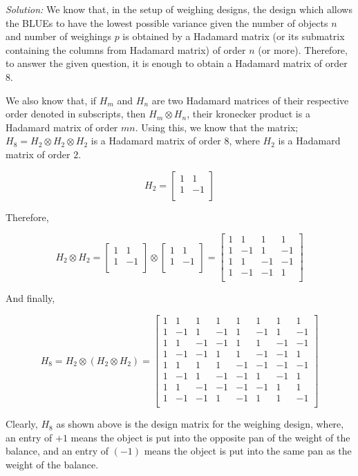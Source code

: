 \documentclass[12pt]{article}
\theoremstyle{definition}
\newenvironment{answer}{\textit{Solution: }\quad }{ \hfill \qedsymbol}
\begin{document}
\begin{answer}
	We know that, in the setup of weighing designs, the design which allows the BLUEs to have the lowest possible variance given the number of objects $n$ and number of weighings $p$ is obtained by a Hadamard matrix (or its submatrix containing the columns from Hadamard matrix) of order $n$ (or more). Therefore, to answer the given question, it is enough to obtain a Hadamard matrix of order $8$.
	
	We also know that, if $H_m$ and $H_n$ are two Hadamard matrices of their respective order denoted in subscripts, then $H_m \otimes H_n$, their kronecker product is a Hadamard matrix of order $mn$. Using this, we know that the matrix; $H_8 = H_2 \otimes H_2 \otimes H_2$ is a Hadamard matrix of order $8$, where $H_2$ is a Hadamard matrix of order $2$.

	$$H_2 = \begin{bmatrix}
		1 & 1\\
		1 & -1\\
	\end{bmatrix}$$

	Therefore,

	$$H_2 \otimes H_2 = \begin{bmatrix}
		1 & 1\\
		1 & -1\\
	\end{bmatrix} \otimes \begin{bmatrix}
		1 & 1\\
		1 & -1\\
	\end{bmatrix} = \begin{bmatrix}
		1 & 1 & 1 & 1\\
		1 & -1 & 1 & -1\\
		1 & 1 & -1 & -1\\
		1 & -1 & -1 & 1\\ 
	\end{bmatrix}$$

	And finally,

	$$H_8 = H_2 \otimes (H_2 \otimes H_2) = \begin{bmatrix}
		1 & 1 & 1 & 1 & 1 & 1 & 1 & 1\\
		1 & -1 & 1 & -1 & 1 & -1 & 1 & -1\\ 
		1 & 1 & -1 & -1 & 1 & 1 & -1 & -1\\
		1 & -1 & -1 & 1 & 1 & -1 & -1 & 1\\
		1 & 1 & 1 & 1 & -1 & -1 & -1 & -1\\
		1 & -1 & 1 & -1 & -1 & 1 & -1 & 1\\ 
		1 & 1 & -1 & -1 & -1 & -1 & 1 & 1\\
		1 & -1 & -1 & 1 & -1 & 1 & 1 & -1\\
	\end{bmatrix}$$

	Clearly, $H_8$ as shown above is the design matrix for the weighing design, where, an entry of $+1$ means the object is put into the opposite pan of the weight of the balance, and an entry of $(-1)$ means the object is put into the same pan as the weight of the balance.
\end{answer}
\end{document}
